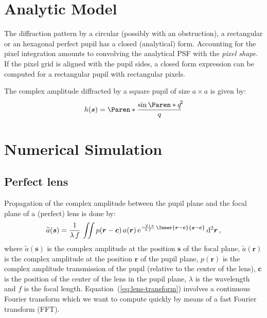 \documentclass[a4paper,10pt,twocolumn]{scrartcl}
\title{\Title}
\author{\Authors}
\newcommand*{\mathd}{\mathrm{d}}
\newcommand*{\mathe}{\mathrm{e}}
\newcommand*{\mathi}{\mathrm{i}}
\newcommand*{\FT}[1]{\widetilde{#1}}
\newcommand*{\V}[1]{\boldsymbol{#1}}   %
\begin{document}
\maketitle

\begin{abstract}
Abstract...
\end{abstract}

\section{Analytic Model}

The diffraction pattern by a circular (possibly with an obstruction), a
rectangular or an hexagonal perfect pupil has a closed (analytical) form. 
Accounting for the pixel integration amounts to convolving the analytical
PSF with the \emph{pixel shape}.  If the pixel grid is aligned with the
pupil sides, a closed form expression can be computed for a rectangular
pupil with rectangular pixels.

The complex amplitude diffracted by a square pupil of size $a \times a$ is given by:
\begin{equation}
  h(\V s) = \Paren*{\frac{\sin\Paren*{q}}{q}}^{\!\!2}
\end{equation}


\section{Numerical Simulation}

\subsection{Perfect lens}

Propagation of the complex amplitude between the pupil plane and the focal
plane of a (perfect) lens is done by:
\begin{align}
  \FT{a}(\V s) = \frac{1}{\lambda\,f} \, \iint p(\V r - \V c) \, a(\V r) \, \mathe^{
    \frac{-2\,\mathi\,\pi}{\lambda\,f}\,\Inner{\V r - \V c}{\V s - \V c}
  } \, \mathd^2\V r \, ,
  \label{eq:lens-transform}
\end{align}
where $\FT{a}(\V s)$ is the complex amplitude at the position $\V s$ of the
focal plane, $\FT{a}(\V r)$ is the complex amplitude at the position $\V r$
of the pupil plane, $p(\V r)$ is the complex amplitude transmission of the
pupil (relative to the center of the lens), $\V c$ is the position of the
center of the lens in the pupil plane, $\lambda$ is the wavelength and $f$
is the focal length. Equation~(\ref{eq:lens-transform}) involves a
continuous Fourier transform which we want to compute quickly by means of a
fast Fourier transform (FFT).
\end{document}
